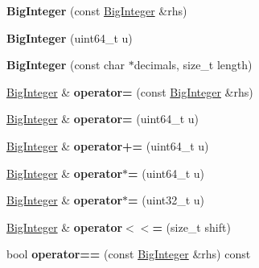 \begin{DoxyCompactItemize}
\item 
{\bfseries Big\+Integer} (const \hyperlink{a00048}{Big\+Integer} \&rhs)\hypertarget{a00048_abec623168bc9494dec2f50643b897f72}{}\label{a00048_abec623168bc9494dec2f50643b897f72}

\item 
{\bfseries Big\+Integer} (uint64\+\_\+t u)\hypertarget{a00048_ad02b0ef9da203efddd4af07e923732c0}{}\label{a00048_ad02b0ef9da203efddd4af07e923732c0}

\item 
{\bfseries Big\+Integer} (const char $\ast$decimals, size\+\_\+t length)\hypertarget{a00048_a656bd1bd4af3920beb90ba4af87b6181}{}\label{a00048_a656bd1bd4af3920beb90ba4af87b6181}

\item 
\hyperlink{a00048}{Big\+Integer} \& {\bfseries operator=} (const \hyperlink{a00048}{Big\+Integer} \&rhs)\hypertarget{a00048_ae3eaf1b96cd993511c9f48a14dfc3af2}{}\label{a00048_ae3eaf1b96cd993511c9f48a14dfc3af2}

\item 
\hyperlink{a00048}{Big\+Integer} \& {\bfseries operator=} (uint64\+\_\+t u)\hypertarget{a00048_a4002e0b1cf5ee68ab94ab65b35167a38}{}\label{a00048_a4002e0b1cf5ee68ab94ab65b35167a38}

\item 
\hyperlink{a00048}{Big\+Integer} \& {\bfseries operator+=} (uint64\+\_\+t u)\hypertarget{a00048_a09af1d6658d51ad4372649ce1c9c1a62}{}\label{a00048_a09af1d6658d51ad4372649ce1c9c1a62}

\item 
\hyperlink{a00048}{Big\+Integer} \& {\bfseries operator$\ast$=} (uint64\+\_\+t u)\hypertarget{a00048_a79a52c6135c9783f2e53432dce2cde89}{}\label{a00048_a79a52c6135c9783f2e53432dce2cde89}

\item 
\hyperlink{a00048}{Big\+Integer} \& {\bfseries operator$\ast$=} (uint32\+\_\+t u)\hypertarget{a00048_a83e8e464b7bc31c8b2c943f8563b2226}{}\label{a00048_a83e8e464b7bc31c8b2c943f8563b2226}

\item 
\hyperlink{a00048}{Big\+Integer} \& {\bfseries operator$<$$<$=} (size\+\_\+t shift)\hypertarget{a00048_a48b12ef4676f19290dfd5816a4ef4a88}{}\label{a00048_a48b12ef4676f19290dfd5816a4ef4a88}

\item 
bool {\bfseries operator==} (const \hyperlink{a00048}{Big\+Integer} \&rhs) const \hypertarget{a00048_a567ecda3009de20400a2af649fb87e60}{}\label{a00048_a567ecda3009de20400a2af649fb87e60}


\end{DoxyCompactItemize}
